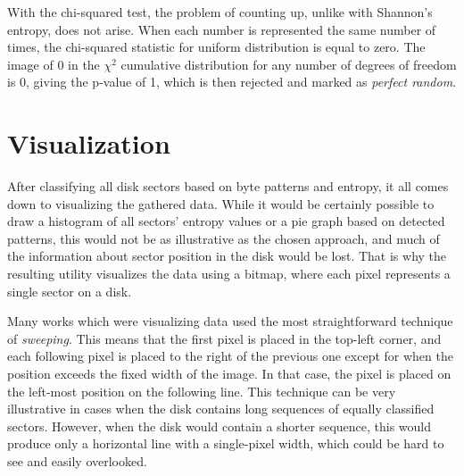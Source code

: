 \documentclass[
  digital, %
  color,   %
  oneside, %
  lof,     %
  nolot,     %
]{fithesis4}
\begin{document}
With the chi-squared test, the problem of counting up, unlike with Shannon's entropy, does not arise. When each number is represented the same number of times, the chi-squared statistic for uniform distribution is equal to zero. The image of 0 in the $\chi^2$ cumulative distribution for any number of degrees of freedom is 0, giving the p-value of 1, which is then rejected and marked as \emph{perfect random}.

\section{Visualization}
\label{sec:visualization}
After classifying all disk sectors based on byte patterns and entropy, it all comes down to visualizing the gathered data.
While it would be certainly possible to draw a histogram of all sectors' entropy values or a pie graph based on detected patterns, this would not be as illustrative as the chosen approach, and much of the information about sector position in the disk would be lost.
That is why the resulting utility visualizes the data using a bitmap, where each pixel represents a single sector on a disk.

Many works which were visualizing data used the most straightforward technique of \emph{sweeping}.\cite{hargreaves13, charalampidis18, broz11}
This means that the first pixel is placed in the top-left corner, and each following pixel is placed to the right of the previous one except for when the position exceeds the fixed width of the image.
In that case, the pixel is placed on the left-most position on the following line.
This technique can be very illustrative in cases when the disk contains long sequences of equally classified sectors.
However, when the disk would contain a shorter sequence, this would produce only a horizontal line with a single-pixel width, which could be hard to see and easily overlooked. 

\end{document}
